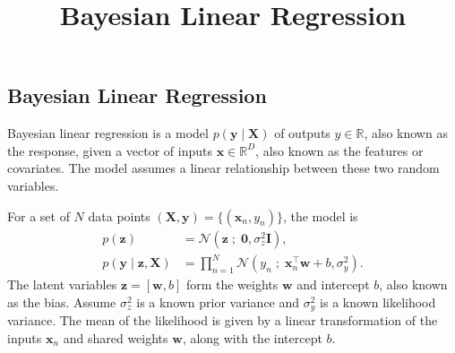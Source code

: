 \title{Bayesian Linear Regression}

\subsection{Bayesian Linear Regression}


Bayesian linear regression is a model $p(\mathbf{y}\mid \mathbf{X})$ of
outputs $y\in\mathbb{R}$, also known as the response, given
a vector of inputs
$\mathbf{x}\in\mathbb{R}^D$, also known as the features or covariates.
The model assumes a
linear relationship between these two random variables.

For a set of $N$ data points $(\mathbf{X},\mathbf{y})=\{(\mathbf{x}_n, y_n)\}$,
the model is
\begin{align*}
  p(\mathbf{z})
  &=
  \mathcal{N}(\mathbf{z} \;;\; \mathbf{0}, \sigma_z^2\mathbf{I}),
  \\
  p(\mathbf{y} \mid \mathbf{z}, \mathbf{X})
  &=
  \prod_{n=1}^N
  \mathcal{N}(y_n \;;\; \mathbf{x}_n^\top\mathbf{w} + b, \sigma_y^2).
\end{align*}
The latent variables $\mathbf{z}=[\mathbf{w},b]$ form the weights $\mathbf{w}$
and intercept $b$, also known as the bias.
Assume $\sigma_z^2$ is a known prior variance and $\sigma_y^2$ is a
known likelihood variance. The mean of the likelihood is given by a
linear transformation of the inputs $\mathbf{x}_n$ and shared weights
$\mathbf{w}$, along with the intercept $b$.

